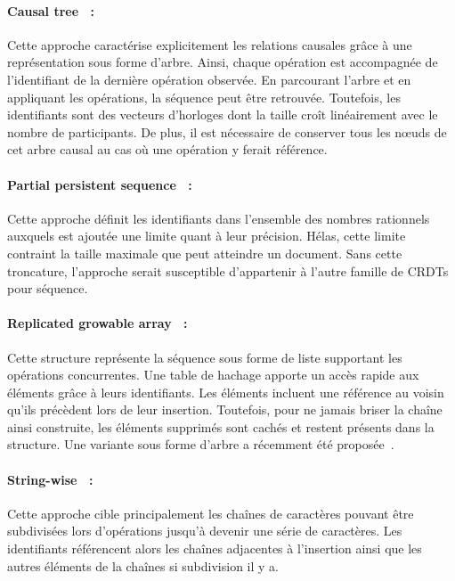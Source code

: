 \paragraph{Causal tree~\cite{grishchenko2010deep} :} Cette approche caractérise
explicitement les relations causales grâce à une représentation sous forme
d'arbre. Ainsi, chaque opération est accompagnée de l'identifiant de la dernière
opération observée. En parcourant l'arbre et en appliquant les opérations, la
séquence peut être retrouvée. Toutefois, les identifiants sont des vecteurs
d'horloges dont la taille croît linéairement avec le nombre de participants. De
plus, il est nécessaire de conserver tous les nœuds de cet arbre causal au cas
où une opération y ferait référence.

\paragraph{Partial persistent sequence~\cite{wu2010partial} :} Cette approche
définit les identifiants dans l'ensemble des nombres rationnels auxquels est
ajoutée une limite quant à leur précision. Hélas, cette limite contraint la
taille maximale que peut atteindre un document. Sans cette troncature,
l'approche serait susceptible d'appartenir à l'autre famille de CRDTs pour
séquence.

\paragraph{Replicated growable array~\cite{roh2011replicated} :} Cette structure
représente la séquence sous forme de liste supportant les opérations
concurrentes. Une table de hachage apporte un accès rapide aux éléments grâce à
leurs identifiants. Les éléments incluent une référence au voisin qu'ils
précèdent lors de leur insertion. Toutefois, pour ne jamais briser la chaîne
ainsi construite, les éléments supprimés sont cachés et restent présents dans la
structure. Une variante sous forme d'arbre a récemment été
proposée~\cite{attiya2016specification}.

\paragraph{String-wise~\cite{yu2012stringwise} :} Cette approche cible
principalement les chaînes de caractères pouvant être subdivisées lors
d'opérations jusqu'à devenir une série de caractères. Les identifiants
référencent alors les chaînes adjacentes à l'insertion ainsi que les autres
éléments de la chaînes si subdivision il y a. 

